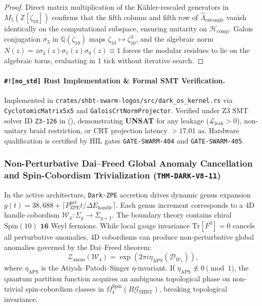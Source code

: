 \documentclass[11pt,onecolumn]{article}
\begin{document}
\begin{proof}
Direct matrix multiplication of the K\"ahler-rescaled generators in $M_5(\mathbb{Z}[\zeta_{10}])$ confirms that the fifth column and fifth row of $\hat{\Lambda}_{\text{entangle}}$ vanish identically on the computational subspace, ensuring unitarity on $\mathcal{H}_{\text{comp}}$. Galois conjugation $\sigma_3$ in $\mathbb{Q}(\zeta_{10})$ maps $\zeta_{10} \mapsto \zeta_{10}^3$, and the algebraic norm $N(z) = z \sigma_3(z) \sigma_7(z) \sigma_9(z) \equiv 1$ forces the modular residues to lie on the algebraic torus, evaluating in 1 tick without iterative search.
\end{proof}

\paragraph{\texttt{\#![no\_std]} Rust Implementation \& Formal SMT Verification.}
Implemented in \texttt{crates/shbt-swarm-logos/src/dark\_os\_kernel.rs} via \texttt{CyclotomicMatrix5x5} and \texttt{GaloisCrtNormProjector}. Verified under Z3 SMT solver ID \texttt{Z3-126} in  (), demonstrating \textbf{UNSAT} for any leakage ($\mathcal{L}_{\text{leak}} > 0$), non-unitary braid restriction, or CRT projection latency $> 17.01\text{ as}$. Hardware qualification is certified by HIL gates \texttt{GATE-SWARM-404} and \texttt{GATE-SWARM-405}.


\subsubsection{Non-Perturbative Dai--Freed Global Anomaly Cancellation and Spin-Cobordism Trivialization (\texttt{THM-DARK-V8-11})}
\label{subsubsec:thm_dark_v8_11}

In the active architecture, \texttt{Dark-ZPE} accretion drives dynamic genus expansion $g(t) = 38,688 + \lceil P_{\text{ZPE}}^{\text{net}} t / \Delta E_{\text{handle}} \rceil$. Each genus increment corresponds to a 4D handle cobordism $\mathcal{W}_4: \Sigma_g \to \Sigma_{g+1}$. The boundary theory contains chiral $\text{Spin}(10)$ $\mathbf{16}$ Weyl fermions. While local gauge invariance $\text{Tr}[F^3] = 0$ cancels all perturbative anomalies, 4D cobordisms can produce non-perturbative global anomalies governed by the Dai--Freed theorem:
\begin{equation}
\mathcal{Z}_{\text{anom}}(\mathcal{W}_4) = \exp\left(2\pi i \eta_{\text{APS}}(\mathcal{D}_{\mathcal{W}_4})\right),
\end{equation}
where $\eta_{\text{APS}}$ is the Atiyah--Patodi--Singer $\eta$-invariant. If $\eta_{\text{APS}} \not\equiv 0 \pmod 1$, the quantum partition function acquires an ambiguous topological phase on non-trivial spin-cobordism classes in $\Omega_4^{\text{Spin}}(B\mathcal{G}_{\text{SHBT}})$, breaking topological invariance.
\end{document}
